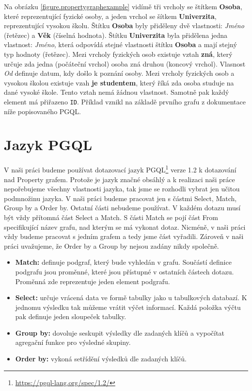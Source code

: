 Na obrázku \ref{figure.propertygraphexample} vidímě tři vrcholy se štítkem \textbf{Osoba}, které reprezentující fyzické osoby, a jeden vrchol se šítkem \textbf{Univerzita}, reprezentující vysokou školu.
Štítku \textbf{Osoba} byly přiděleny dvě vlastnosti: \textit{Jméno} (řetězec) a \textbf{Věk} (číselná hodnota).
Štítku \textbf{Univerzita} byla přidělena jedna vlastnost: \textit{Jméno}, která odpovídá stejné vlastnosti štítku \textbf{Osoba} a mají stejný typ hodnoty (řetězec).
Mezi vrcholy fyzických osob existuje vztah \textbf{zná}, který určuje zda jedna (počáteční vrchol) osoba zná druhou (koncový vrchol).
Vlasnost \textit{Od} definuje datum, kdy došlo k poznání osoby.
Mezi vrcholy fyzických osob a vysokou školou existuje vzah \textbf{je studentem}, který říká zda osoba studuje na dané vysoké škole.
Tento vztah nemá žádnou vlastnost.
Samotně pak každý element má přiřazeno \texttt{ID}.
Příklad vznikl na základě prvního grafu z dokumentace níže popisovaného PGQL.

\section{Jazyk PGQL}
\label{req.pgql}

V naši práci budeme používat dotazovací jazyk PGQL\footnote{\url{https://pgql-lang.org/spec/1.2/}} verze 1.2 k dotazování nad Property grafem.
Protože je jazyk značné obsáhlý a k realizaci naši práce nepořebujeme všechny vlastnosti jazyka, tak jsme se rozhodli vybrat jen učitou podmnožinu jazyka.
V naši práci budeme pracovat jen s částmi Select, Match, Group by a Order by.
Ostatní části nebudeme používat.
V každém dotazu musí být vždy přítomná část Select a Match.
S části Match se pojí část From specifikující název grafu, nad kterým se má vykonat dotaz.
Nicméně, v naši práci vždy budeme pracovat s jedním grafem a tedy jsme část vyřadili. 
Zároveň v naši práci uvažujeme, že Order by a Group by nejsou zadány nikdy společně.

\begin{itemize}
\item \textbf{Match:} definuje podgraf, který bude vyhledán v grafu.
Součástí definice podgrafu jsou proměnné, které jsou přístupné v ostatních částech dotazu.
Proměnná zde reprezentuje jeden element podgrafu.

\item \textbf{Select:} určuje vrácená data ve formě tabulky jako u tabulkových databazí.
K jednomu výsledku tak můžeme vrátit výčet informací.
Každá položka výčtu pak definuje jeden sloupeček tabulky.

\item \textbf{Group by:} dovoluje seskupit výsledky dle zadaných klíčů a vypočítat agregační funkce pro výsledné skupiny.

\item \textbf{Order by:} vykoná setřídění výsledků dle zadaných klíčů.
\end{itemize}

